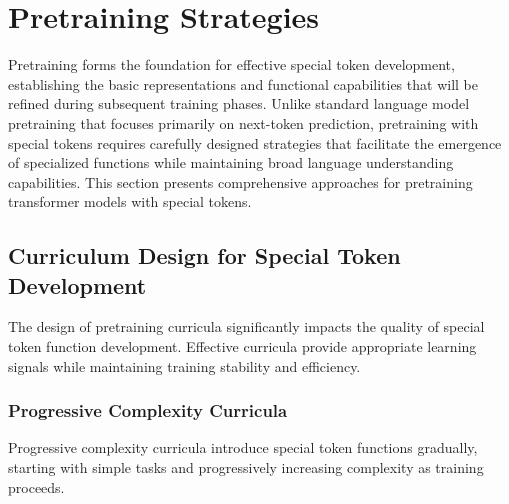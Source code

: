 
\section{Pretraining Strategies}

Pretraining forms the foundation for effective special token development, establishing the basic representations and functional capabilities that will be refined during subsequent training phases. Unlike standard language model pretraining that focuses primarily on next-token prediction, pretraining with special tokens requires carefully designed strategies that facilitate the emergence of specialized functions while maintaining broad language understanding capabilities. This section presents comprehensive approaches for pretraining transformer models with special tokens.
\begin{comment}
Feedback: Before diving into the specifics, it's helpful to frame the core challenge. For example: "The main challenge in pretraining special tokens is that they are often 'meta-level' instructions that are not naturally present in raw text. A standard pretraining objective like next-token prediction doesn't explicitly teach a [CLS] token how to summarize, or a [SEP] token how to separate concepts. Therefore, specialized pretraining strategies are needed to create learning signals that directly encourage these desired functions."
\end{comment}

\subsection{Curriculum Design for Special Token Development}

The design of pretraining curricula significantly impacts the quality of special token function development. Effective curricula provide appropriate learning signals while maintaining training stability and efficiency.

\subsubsection{Progressive Complexity Curricula}

Progressive complexity curricula introduce special token functions gradually, starting with simple tasks and progressively increasing complexity as training proceeds.
\begin{comment}
Feedback: A concrete example would make this concept much clearer. For instance: "A progressive curriculum for a model with [CLS] and [SEP] tokens might look like this:
1.  **Phase 1 (Language Modeling)**: Train the model on a standard masked language modeling (MLM) objective *without* the Next Sentence Prediction (NSP) task. This allows the content embeddings to stabilize and learn basic language.
2.  **Phase 2 (Introduce NSP)**: After the MLM loss has started to converge, introduce the NSP task, which specifically trains the [CLS] and [SEP] tokens to understand relationships between sentences.
This two-phase approach is often more stable than trying to learn everything simultaneously from scratch."
\end{comment}

